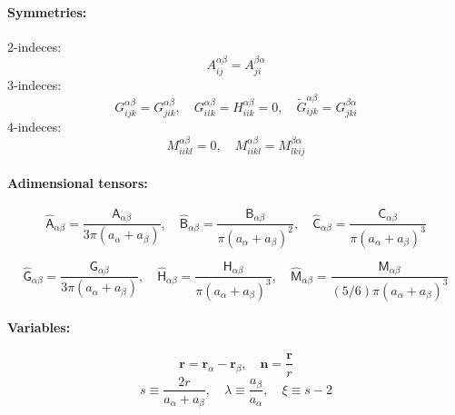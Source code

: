 \documentclass[12pt]{article}
\newcommand{\tens}[1]{\bm{\mathsf{#1}}}
\begin{document}


\paragraph{Symmetries:}
2-indeces:
\begin{equation}
 A_{ij}^{\alpha\beta} =  A_{ji}^{\beta\alpha}
\end{equation}
3-indeces:
\begin{equation}
 G_{ijk}^{\alpha\beta} =   G_{jik}^{\alpha\beta} , \quad 
 G_{iik}^{\alpha\beta} =   H_{iik}^{\alpha\beta}  = 0, \quad 
 \tilde{G}_{ijk}^{\alpha\beta}  =  G_{jki}^{\beta\alpha} 
\end{equation}
4-indeces:
\begin{equation}
 M_{iikl}^{\alpha\beta} = 0,
\quad 
 M_{iikl}^{\alpha\beta} =  M_{lkij}^{\beta\alpha} 
\end{equation}

\paragraph{Adimensional tensors:}
\begin{equation}
 \hat{\tens{A}}_{\alpha\beta}
= \frac{\tens{A}_{\alpha\beta}}{3\pi(a_{\alpha} + a_{\beta})},
\quad
 \hat{\tens{B}}_{\alpha\beta}
= \frac{\tens{B}_{\alpha\beta}}{\pi(a_{\alpha}+ a_{\beta})^2},
\quad
 \hat{\tens{C}}_{\alpha\beta}
= \frac{\tens{C}_{\alpha\beta}}{\pi(a_{\alpha}+ a_{\beta})^3}
\end{equation}

\begin{equation}
 \hat{\tens{G}}_{\alpha\beta}
= \frac{\tens{G}_{\alpha\beta}}{3\pi(a_{\alpha} + a_{\beta})},
\quad
 \hat{\tens{H}}_{\alpha\beta}
= \frac{\tens{H}_{\alpha\beta}}{\pi(a_{\alpha}+ a_{\beta})^3},
\quad
 \hat{\tens{M}}_{\alpha\beta}
= \frac{\tens{M}_{\alpha\beta}}{(5/6)\pi(a_{\alpha}+ a_{\beta})^3}
\end{equation}

\paragraph{Variables:}
\begin{equation}
 \bm{r} = \bm{r}_\alpha - \bm{r}_\beta, \quad
 \bm{n} = \frac{\bm{r}}{r}
\end{equation}
\begin{equation}
  s \equiv \frac{2r}{a_{\alpha}+ a_{\beta}}, \quad
 \lambda \equiv \frac{a_\beta}{a_\alpha}, \quad
\xi \equiv s - 2
\end{equation}
\end{document}
